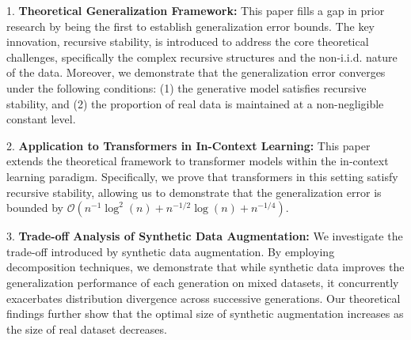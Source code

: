 
1. \textbf{Theoretical Generalization Framework:} This paper fills a gap in prior research by being the first to establish generalization error bounds. The key innovation, recursive stability, is introduced to address the core theoretical challenges, specifically the complex recursive structures and the non-i.i.d. nature of the data. Moreover, we demonstrate that the generalization error converges under the following conditions: (1) the generative model satisfies recursive stability, and (2) the proportion of real data is maintained at a non-negligible constant level.

2. \textbf{Application to Transformers in In-Context Learning:} This paper extends the theoretical framework to transformer models within the in-context learning paradigm. Specifically, we prove that transformers in this setting satisfy recursive stability, allowing us to demonstrate that the generalization error is bounded by $\mathcal{O}(n^{-1}\log^2(n) + n^{-1/2}\log(n) + n^{-1/4})$.

3. \textbf{Trade-off Analysis of Synthetic Data Augmentation:}  We investigate the trade-off introduced by synthetic data augmentation. By employing decomposition techniques, we demonstrate that while synthetic data improves the generalization performance of each generation on mixed datasets, it concurrently exacerbates distribution divergence across successive generations. Our theoretical findings further show that the optimal size of synthetic augmentation increases as the size of real dataset decreases.
